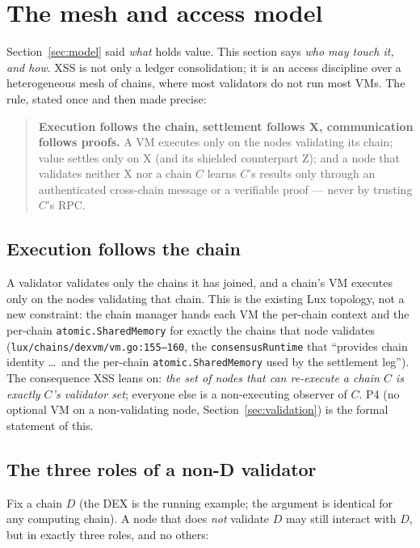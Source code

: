 \section{The mesh and access model}
\label{sec:mesh}

Section~\ref{sec:model} said \emph{what} holds value. This section says
\emph{who may touch it, and how}. XSS is not only a ledger
consolidation; it is an access discipline over a heterogeneous mesh of
chains, where most validators do not run most VMs. The rule, stated
once and then made precise:

\begin{quote}
\textbf{Execution follows the chain, settlement follows X,
communication follows proofs.} A VM executes only on the nodes
validating its chain; value settles only on X (and its shielded
counterpart Z); and a node that validates neither X nor a chain $C$
learns $C$'s results only through an authenticated cross-chain message
or a verifiable proof --- never by trusting $C$'s RPC.
\end{quote}

\subsection{Execution follows the chain}

A validator validates only the chains it has joined, and a chain's VM
executes only on the nodes validating that chain. This is the existing
Lux topology, not a new constraint: the chain manager hands each VM the
per-chain context and the per-chain \texttt{atomic.SharedMemory} for
exactly the chains that node validates
(\texttt{lux/chains/dexvm/vm.go:155--160}, the \texttt{consensusRuntime}
that ``provides chain identity \ldots\ and the per-chain
\texttt{atomic.SharedMemory} used by the settlement leg''). \IMPL{} The
consequence XSS leans on: \emph{the set of nodes that can re-execute a
chain $C$ is exactly $C$'s validator set}; everyone else is a
non-executing observer of $C$. P4 (no optional VM on a non-validating
node, Section~\ref{sec:validation}) is the formal statement of this.

\subsection{The three roles of a non-D validator}

Fix a chain $D$ (the DEX is the running example; the argument is
identical for any computing chain). A node that does \emph{not} validate
$D$ may still interact with $D$, but in exactly three roles, and no
others:

